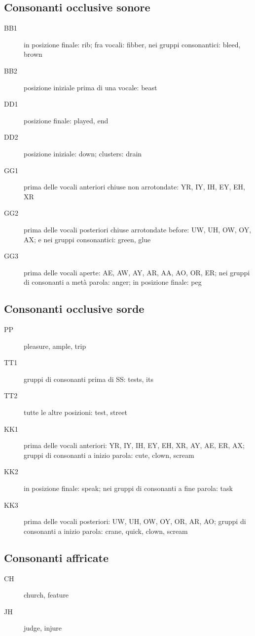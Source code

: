 \subsection{Consonanti occlusive sonore}
\begin{description}
\item[BB1] in posizione finale: rib; fra vocali: fibber, nei gruppi consonantici: bleed, brown
\item[BB2] posizione iniziale prima di una vocale: beast
\item[DD1] posizione finale: played, end
\item[DD2] posizione iniziale: down; clusters: drain
\item[GG1] prima delle vocali anteriori chiuse non arrotondate: YR, IY, IH, EY, EH, XR
\item[GG2] prima delle vocali posteriori chiuse arrotondate before: UW, UH, OW, OY, AX; e nei gruppi consonantici: green, glue
\item[GG3] prima delle vocali aperte: AE, AW, AY, AR, AA, AO, OR, ER; nei gruppi di consonanti a metà parola: anger; in posizione finale: peg
\end{description}


\subsection{Consonanti occlusive sorde}
\begin{description}
\item[PP] pleasure, ample, trip
\item[TT1] gruppi di consonanti prima di SS: tests, its
\item[TT2] tutte le altre posizioni: test, street
\item[KK1] prima delle vocali anteriori: YR, IY, IH, EY, EH, XR, AY, AE, ER, AX; gruppi di consonanti a inizio parola: cute, clown, scream
\item[KK2] in posizione finale: speak; nei gruppi di consonanti a fine parola: task
\item[KK3] prima delle vocali posteriori: UW, UH, OW, OY, OR, AR, AO; gruppi di consonanti a inizio parola: crane, quick, clown, scream
\end{description}

\subsection{Consonanti affricate}
\begin{description}
\item[CH] church, feature
\item[JH] judge, injure
\end{description}

